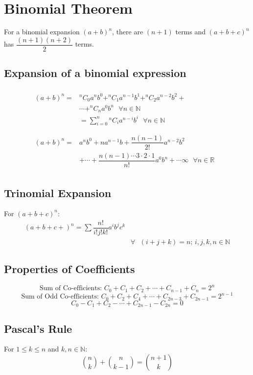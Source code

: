 \large{\chapter{Binomial Theorem}}
For a binomial expansion $(a+b)^n$, there are $(n+1)$ terms and $(a+b+c)^n$ has $\dfrac{(n+1)(n+2)}{2}$ terms.
\section{Expansion of a binomial expression\newline}
\begin{eqnarray}
	\begin{aligned}
		\begin{split}
			(a+b)^n= & ^nC_0 a^n b^0+^nC_1 a^{n-1} b^1+^nC_2 a^{n-2} b^2+ & \\ & \cdots+^nC_n a^0 b^n\text{ }\forall n \in \mathbb{N} & \\ & =\sum_{i=0}^{n} {^nC_{i}} a^{n-i} b^i\text{ }\forall n \in \mathbb{N}
		\end{split}
	\end{aligned}\\
	\begin{aligned}
		\begin{split}
			(a+b)^n= & a^n b^0+na^{n-1}b+\dfrac{n(n-1)}{2!}a^{n-2}b^2 & \\ & +\cdots+\dfrac{n(n-1)\cdots3\cdot2\cdot1}{n!} a^0 b^n+\cdots\infty \text{ }\forall n \in \mathbb{R}
		\end{split}
	\end{aligned}
\end{eqnarray}

\section{Trinomial Expansion}
For $(a+b+c)^n$:
\begin{equation}
	\begin{split}
		(a+b+c+)^n=\sum \dfrac{n!}{i! j! k!} a^i b^j c^k & \\ & \forall\text{ }(i+j+k)=n\text{; }i,j,k,n \in \mathbb{N}
	\end{split}
\end{equation}

\section{Properties of Coefficients}
\begin{equation}
	\text{Sum of Co-efficients: }C_0+C_1+C_2+\cdots+C_{n-1}+C_n=2^n
\end{equation}
\begin{equation}
	\text{Sum of Odd Co-efficients: }C_0+C_2+C_4+\cdots+C_{2n-3}+C_{2n-1}=2^{n-1}
\end{equation}
\begin{equation}
	C_0-C_1+C_2-\cdots+C_{2n-1}-C_{2n}=0
\end{equation}




\section{Pascal's Rule}
For $1 \leq k \leq n$ and  $k,n \in \mathbb{N}$:
\begin{equation}
	{{n}\choose{k}}+{{n}\choose{k-1}} ={{n+1}\choose{k}}
\end{equation}
